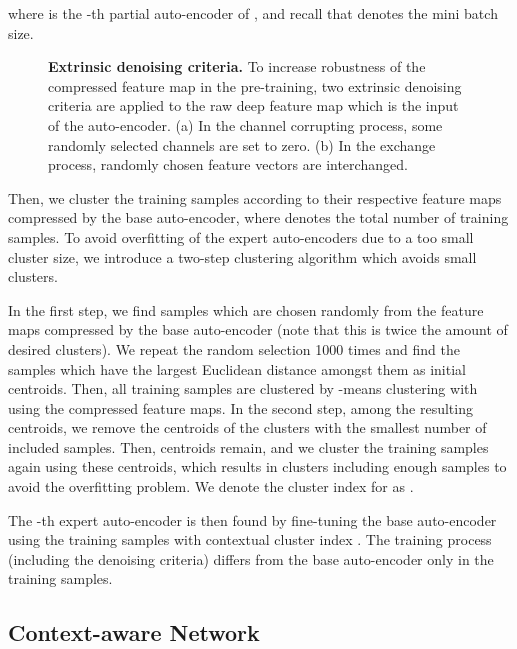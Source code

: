 \documentclass[10pt,twocolumn,letterpaper]{article}
\begin{document}
\normalsize
where  is the -th partial auto-encoder of , and recall that  denotes the mini batch size.



\begin{figure}[t]
    \hfill
    \caption{\textbf{Extrinsic denoising criteria.} To increase robustness of the compressed feature map in the pre-training, two extrinsic denoising criteria are applied to the raw deep feature map which is the input of the auto-encoder. (a) In the channel corrupting process, some randomly selected channels are set to zero. (b) In the exchange process, randomly chosen feature vectors are interchanged.}
    \label{fig:denoising}
    \vspace{-0.4cm}
\end{figure}

Then, we cluster the training samples  according to their respective feature maps compressed by the base auto-encoder, where  denotes the total number of training samples.
To avoid overfitting of the expert auto-encoders due to a too small cluster size, we introduce a two-step clustering algorithm which avoids small clusters.

In the first step, we find  samples which are chosen randomly from the feature maps compressed by the base auto-encoder (note that this is twice the amount of desired clusters). 
We repeat the random selection 1000 times and find the samples which have the largest Euclidean distance amongst them as initial centroids.
Then, all training samples are clustered by -means clustering with  using the compressed feature maps. 
In the second step, among the resulting  centroids, we remove the  centroids of the clusters with the smallest number of included samples. 
Then,  centroids remain, and we cluster the training samples again using these centroids, which results in  clusters including enough samples to avoid the overfitting problem.
We denote the cluster index for  as .

The -th expert auto-encoder  is then found by fine-tuning the base auto-encoder using the training samples with contextual cluster index .
The training process (including the denoising criteria) differs from the base auto-encoder only in the training samples.
 \subsection{Context-aware Network} \label{sec:contextnet}
\end{document}
